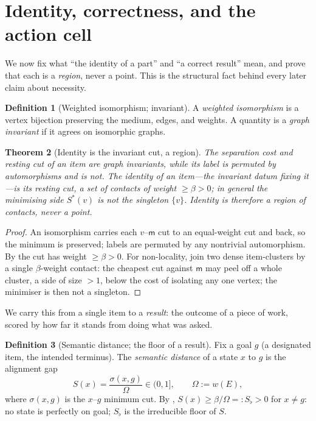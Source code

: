 \documentclass[twocolumn,11pt,a4paper]{article}
\theoremstyle{sup}
\newtheorem{theorem}{Theorem}[section]
\theoremstyle{definition}
\newtheorem{definition}[theorem]{Definition}
\theoremstyle{remark}
\newcommand{\E}{E}                    %
\newcommand{\flo}{\beta}              %
\newcommand{\med}{\mathsf{m}}         %
\newcommand{\str}{\sigma}             %
\newcommand{\Om}{\Omega}
\newcommand{\Sent}{S}                 %
\newcommand{\Sflat}{S_{\flat}}        %
\newcommand{\set}[1]{\{#1\}}
\begin{document}
\section{Identity, correctness, and the action cell}
\label{sec:identity}

We now fix what ``the identity of a part'' and ``a correct result'' mean, and
prove that each is a \emph{region}, never a point. This is the structural fact
behind every later claim about necessity.

\begin{definition}[Weighted isomorphism; invariant]
\label{def:iso}
A \emph{weighted isomorphism} is a vertex bijection preserving the medium, edges,
and weights. A quantity is a \emph{graph invariant} if it agrees on isomorphic
graphs.
\end{definition}

\begin{theorem}[Identity is the invariant cut, a region]
\label{thm:region}
The separation cost and resting cut of an item are graph invariants, while its
label is permuted by automorphisms and is not. The identity of an item---the
invariant datum fixing it---is its resting cut, a set of contacts of weight
$\ge\flo>0$; in general the minimising side $S^\ast(v)$ is not the singleton
$\set{v}$. Identity is therefore a region of contacts, never a point.
\end{theorem}

\begin{proof}
An isomorphism carries each $v$--$\med$ cut to an equal-weight cut and back, so
the minimum is preserved; labels are permuted by any nontrivial automorphism.
By  the cut has weight $\ge\flo>0$. For non-locality, join two
dense item-clusters by a single $\flo$-weight contact: the cheapest cut against
$\med$ may peel off a whole cluster, a side of size $>1$, below the cost of
isolating any one vertex; the minimiser is then not a singleton.
\end{proof}

We carry this from a single item to a \emph{result}: the outcome of a piece of
work, scored by how far it stands from doing what was asked.

\begin{definition}[Semantic distance; the floor of a result]
\label{def:Sfunctional}
Fix a goal $g$ (a designated item, the intended terminus). The \emph{semantic
distance} of a state $x$ to $g$ is the alignment gap
\[
\Sent(x)=\frac{\str(x,g)}{\Om}\in(0,1],\qquad \Om:=w(\E),
\]
where $\str(x,g)$ is the $x$--$g$ minimum cut. By ,
$\Sent(x)\ge\flo/\Om=:\Sflat>0$ for $x\neq g$: no state is perfectly on goal;
$\Sflat$ is the irreducible floor of $\Sent$.
\end{definition}
\end{document}
